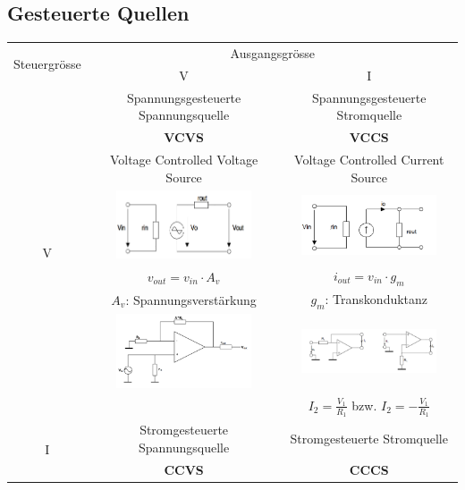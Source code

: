 \subsection{Gesteuerte Quellen}
  \begin{tabular}{|c|c|c|}
		\hline
		\multirow{2}{*}{Steuergrösse} & \multicolumn{2}{c|}{Ausgangsgrösse}\\ \cline{2-3}
		& V & I \\ \hline
		\multirow{8}{*}{V}	& Spannungsgesteuerte Spannungsquelle	& Spannungsgesteuerte Stromquelle		\\
    & \bf{VCVS} & \bf{VCCS} \\
		& Voltage Controlled Voltage Source		& Voltage Controlled Current Source \\ \cline{2-3}
		& \includegraphics[width=4cm,trim=0 0 0 -5]{./bilder/vcvs.png}	
		& \includegraphics[width=4cm,trim=0 0 0 -5]{./bilder/vccs.png}  \\ \cline{2-3}
		& $v_{out}=v_{in} \cdot A_v$ & $i_{out} = v_{in} \cdot g_m$ \\
		& $A_v$: Spannungsverstärkung & $g_m$: Transkonduktanz  \\ \cline{2-3}
		& \includegraphics[width=4cm,trim=0 0 0 -5]{./bilder/vcvs_schaltung.png}
		& \includegraphics[width=4cm,trim=0 0 0 -5]{./bilder/vccs_schaltung.png}  \\
		&	& $I_2=\frac{V_1}{R_1}$ bzw. $I_2=-\frac{V_1}{R_1}$\\ 	\hline	
		\multirow{8}{*}{I}	& Stromgesteuerte Spannungsquelle		& Stromgesteuerte Stromquelle \\
		& \bf{CCVS} & \bf{CCCS} \\

\end{tabular}
